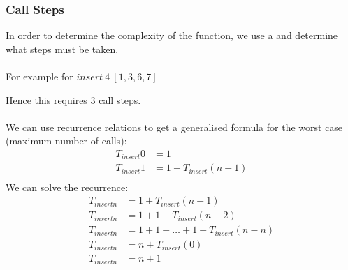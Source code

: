 \documentclass{report}
\begin{document}
        \subsubsection*{Call Steps}
            In order to determine the complexity of the function, we use a  and determine what steps must be taken.
            \\
            \\ For example for $insert \ 4 \ [1,3,6,7]$
            \\ \begin{steps}
            \end{steps}
            Hence this requires $3$ call steps.
            \\
            \\ We can use recurrence relations to get a generalised formula for the worst case (maximum number of calls):
            \[\begin{matrix}
                T_{insert} 0 & = 1 \\
                T_{insert} 1 & = 1 + T_{insert}(n-1) \\
            \end{matrix}\]
            We can solve the recurrence:
            \[\begin{matrix}
                T_{insert n} & = 1 + T_{insert}(n-1) \\
                T_{insert n} & = 1 + 1 + T_{insert}(n-2) \\
                T_{insert n} & = 1 + 1 + \dots + 1 + T_{insert}(n-n) \\
                T_{insert n} & = n + T_{insert}(0) \\
                T_{insert n} & = n + 1 \\
            \end{matrix}\]
\end{document}
